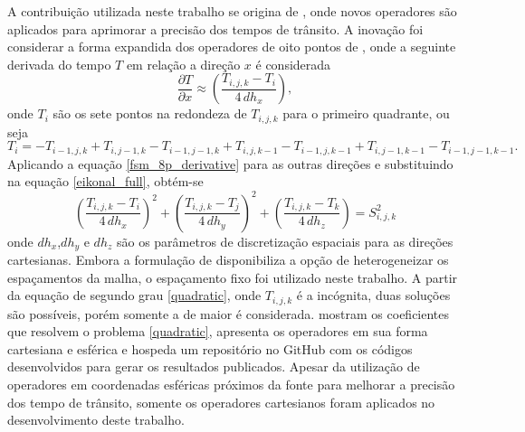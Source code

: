 A contribuição utilizada neste trabalho se origina de , onde novos operadores são aplicados para aprimorar a precisão dos tempos de trânsito. A inovação foi considerar a forma expandida dos operadores de oito pontos de , onde a seguinte derivada do tempo $T$ em relação a direção $x$ é considerada    
\begin{equation}
	\dfrac{\partial T}{\partial x} \approx \left(\dfrac{T_{i,j,k} - T_i}{4\, dh_x}\right),
	\label{fsm_8p_derivative}
\end{equation}
\noindent onde $T_i$ são os sete pontos na redondeza de $T_{i,j,k}$ para o primeiro quadrante, ou seja
\begin{equation}
	T_i = - T_{i-1,j,k} + T_{i,j-1,k} - T_{i-1,j-1,k} + T_{i,j,k-1} - T_{i-1,j,k-1} + T_{i,j-1,k-1} - T_{i-1,j-1,k-1}.
\end{equation} 
\noindent Aplicando a equação \ref{fsm_8p_derivative} para as outras direções e substituindo na equação \ref{eikonal_full}, obtém-se
\begin{equation}
	\left(\dfrac{T_{i,j,k} - T_i}{4\,dh_x}\right)^2 + \left(\dfrac{T_{i,j,k} - T_j}{4\,dh_y}\right)^2 + \left(\dfrac{T_{i,j,k} - T_k}{4\,dh_z}\right) = S^2_{i,j,k}
	\label{quadratic}
\end{equation}
\noindent onde $dh_x$,$dh_y$ e $dh_z$ são os parâmetros de discretização espaciais para as direções cartesianas. Embora a formulação de  disponibiliza a opção de heterogeneizar os espaçamentos da malha, o espaçamento fixo foi utilizado neste trabalho. A partir da equação de segundo grau \ref{quadratic}, onde $T_{i,j,k}$ é a incógnita, duas soluções são possíveis, porém somente a de maior é considerada.  mostram os coeficientes que resolvem o problema \ref{quadratic}, apresenta os operadores em sua forma cartesiana e esférica e hospeda um repositório no GitHub com os códigos desenvolvidos para gerar os resultados publicados. Apesar da utilização de operadores em coordenadas esféricas próximos da fonte para melhorar a precisão dos tempo de trânsito, somente os operadores cartesianos foram aplicados no desenvolvimento deste trabalho.        

